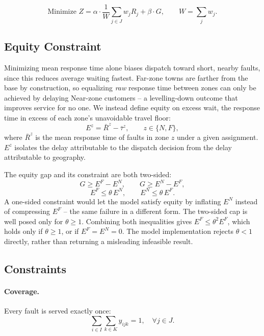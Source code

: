 \documentclass[11pt]{article}
\begin{document}
\begin{equation}
\text{Minimize } Z = \alpha \cdot \frac{1}{W}\sum_{j\in J} w_j R_j + \beta \cdot G, \qquad W = \sum_j w_j.
\end{equation}

\subsection*{Equity Constraint}

Minimizing mean response time alone biases dispatch toward short, nearby faults, since this reduces average waiting fastest. Far-zone towns are farther from the base by construction, so equalizing \emph{raw} response time between zones can only be achieved by delaying Near-zone customers -- a levelling-down outcome that improves service for no one. We instead define equity on excess wait, the response time in excess of each zone's unavoidable travel floor:
\begin{equation}
E^{z} = \bar{R}^{z} - \bar\tau^{z}, \qquad z \in \{N, F\},
\end{equation}
where $\bar{R}^{z}$ is the mean response time of faults in zone $z$ under a given assignment. $E^z$ isolates the delay attributable to the dispatch decision from the delay attributable to geography.

The equity gap and its constraint are both two-sided:
\begin{equation}
G \geq E^{F} - E^{N}, \qquad G \geq E^{N} - E^{F},
\end{equation}
\begin{equation}
E^{F} \leq \theta\, E^{N}, \qquad E^{N} \leq \theta\, E^{F}.
\end{equation}
A one-sided constraint would let the model satisfy equity by inflating $E^N$ instead of compressing $E^F$ -- the same failure in a different form. The two-sided cap is well posed only for $\theta \geq 1$. Combining both inequalities gives $E^F \leq \theta^2 E^F$, which holds only if $\theta \geq 1$, or if $E^F = E^N = 0$. The model implementation rejects $\theta < 1$ directly, rather than returning a misleading infeasible result.

\subsection*{Constraints}

\paragraph{Coverage.} Every fault is served exactly once:
\begin{equation}
\sum_{i \in I}\sum_{k \in K} y_{ijk} = 1, \quad \forall j \in J.
\end{equation}
\end{document}
